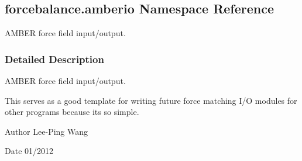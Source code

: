 \hypertarget{namespaceforcebalance_1_1amberio}{}\subsection{forcebalance.\+amberio Namespace Reference}
\label{namespaceforcebalance_1_1amberio}


A\+M\+B\+ER force field input/output.  




\subsubsection{Detailed Description}
A\+M\+B\+ER force field input/output. 

This serves as a good template for writing future force matching I/O modules for other programs because it\textquotesingle{}s so simple.

\begin{DoxyAuthor}{Author}
Lee-\/\+Ping Wang 
\end{DoxyAuthor}
\begin{DoxyDate}{Date}
01/2012 
\end{DoxyDate}
